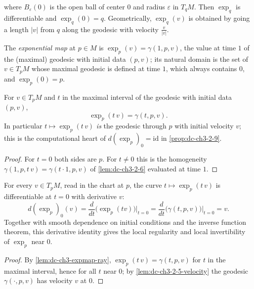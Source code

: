 where $B_\varepsilon(0)$ is the open ball of center $0$ and radius $\varepsilon$
in $T_qM$. Then $\exp_q$ is differentiable and $\exp_q(0)=q$. Geometrically,
$\exp_q(v)$ is obtained by going a length $|v|$ from $q$ along the geodesic with
velocity $\frac{v}{|v|}$.

\begin{definition}
  \label{def:dc-ch3-expmap}
  \leanok
  The \emph{exponential map} at $p\in M$ is $\exp_p(v)=\gamma(1,p,v)$, the value at
  time $1$ of the (maximal) geodesic with initial data $(p,v)$; its natural
  domain is the set of $v\in T_pM$ whose maximal geodesic is defined at time
  $1$, which always contains $0$, and $\exp_p(0)=p$.

\end{definition}

\begin{lemma}
  \label{lem:dc-ch3-expmap-ray}
  \leanok
  For $v\in T_pM$ and $t$ in the maximal interval of the geodesic with initial
  data $(p,v)$,
  $$\exp_p(t\,v)=\gamma(t,p,v).$$
  In particular $t\mapsto\exp_p(t\,v)$ \emph{is} the geodesic through $p$ with
  initial velocity $v$; this is the computational heart of
  $d(\exp_p)_0=\mathrm{id}$ in \cref{prop:dc-ch3-2-9}.
\end{lemma}
\begin{proof}
  \sketch
  \leanok
  For $t=0$ both sides are $p$. For $t\neq0$ this is the homogeneity
  $\gamma(1,p,t\,v)=\gamma(t\cdot 1,p,v)$ of \cref{lem:dc-ch3-2-6} evaluated at
  time $1$.
\end{proof}

\begin{lemma}[$d(\exp_p)_0=\mathrm{id}$ along rays]
  \label{lem:dc-ch3-2-9-dexp}
  \leanok
  For every $v\in T_pM$, read in the chart at $p$, the curve
  $t\mapsto\exp_p(t\,v)$ is differentiable at $t=0$ with derivative $v$:
  $$
  d(\exp_p)_0(v)=\frac{d}{dt}\big(\exp_p(tv)\big)\Big|_{t=0}
    =\frac{d}{dt}\big(\gamma(t,p,v)\big)\Big|_{t=0}=v.
  $$
  Together with smooth dependence on initial conditions and the inverse function
  theorem, this derivative identity gives the local regularity and local
  invertibility of $\exp_p$ near $0$.
\end{lemma}
\begin{proof}
  \sketch
  \leanok
  By \cref{lem:dc-ch3-expmap-ray}, $\exp_p(t\,v)=\gamma(t,p,v)$ for $t$ in the
  maximal interval, hence for all $t$ near $0$; by
  \cref{lem:dc-ch3-2-5-velocity} the geodesic $\gamma(\cdot,p,v)$ has velocity
  $v$ at $0$.
\end{proof}

